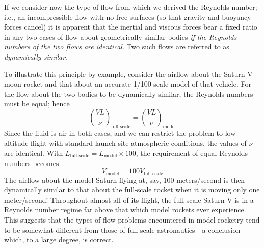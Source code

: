If we consider now the type of flow from which we derived the Reynolds number; i.e.,
an incompressible flow with no free surfaces (so that gravity and buoyancy forces
cancel) it is apparent that the inertial and viscous forces bear a fixed ratio in
any two cases of flow about geometrically similar bodies \emph{if the Reynolds
numbers of the two flows are identical}. Two such flows are referred to as
\emph{dynamically similar}.

To illustrate this principle by example, consider the airflow about the Saturn V
moon rocket and that about an accurate 1/100 scale model of that vehicle. For the
flow about the two bodies to be dynamically similar, the Reynolds numbers must be
equal; hence
\begin{equation}\label{ch3:eq:17}
\left(\frac{VL}{\nu}\right)_{\mathrm{full\text{-}scale}}
  = \left(\frac{VL}{\nu}\right)_{\mathrm{model}}
\end{equation}
Since the fluid is air in both cases, and we can restrict the problem to
low-altitude flight with standard launch-site atmospheric conditions, the values of
$\nu$ are identical. With
$L_{\mathrm{full\text{-}scale}} = L_{\mathrm{model}} \times 100$, the requirement of
equal Reynolds numbers becomes
\begin{equation*}
V_{\mathrm{model}} = 100V_{\mathrm{full\text{-}scale}}
\end{equation*}
The airflow about the model Saturn flying at, say, 100 meters/second is then
dynamically similar to that about the full-scale rocket when it is moving only one
meter/second! Throughout almost all of its flight, the full-scale Saturn V is in a
Reynolds number regime far above that which model rockets ever experience. This
suggests that the types of flow problems encountered in model rocketry tend to be
somewhat different from those of full-scale astronautics---a conclusion which, to a
large degree, is correct.

